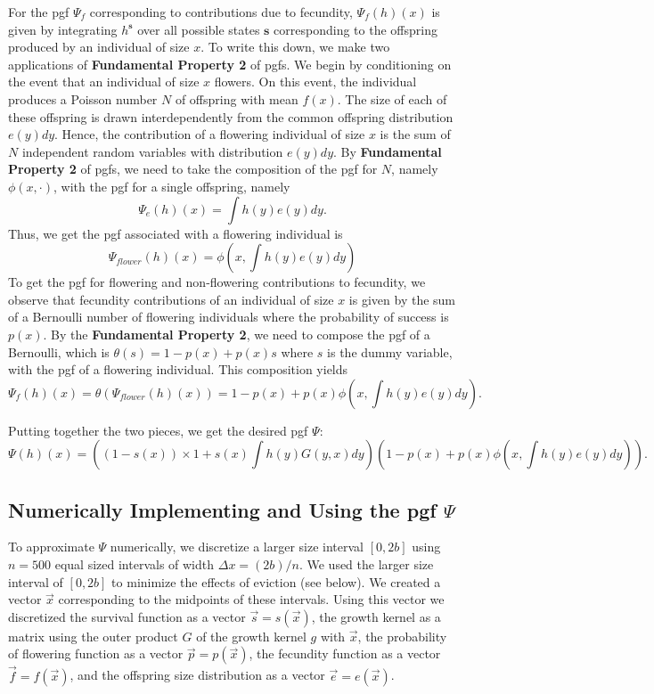 \documentclass[12pt]{amsart}\usepackage[]{graphicx}\usepackage[]{color}
\def\s{\mathbf s}
\begin{document}
For the pgf $\Psi_f$ corresponding to contributions due to fecundity, $\Psi_f(h)(x)$ is given by integrating $h^\s$ over all possible states $\s$ corresponding to the offspring produced by an individual of size $x$.  To write this down, we make two applications of  \textbf{Fundamental Property 2} of pgfs. We begin by conditioning on the event that an individual of size $x$ flowers. On this event, the individual produces a Poisson number $N$ of offspring with mean $f(x)$. The size of each of these offspring is drawn interdependently from the common offspring distribution $e(y)dy$. Hence, the contribution of a flowering individual of size $x$ is the sum of $N$ independent random variables with distribution $e(y)dy$. By \textbf{Fundamental Property 2} of pgfs, we need to take the composition of the pgf for $N$, namely $\phi(x,\cdot)$, with the pgf for a single offspring, namely
\[
\Psi_e(h)(x)=\int h(y)e(y)dy.
\]
Thus, we get the pgf associated with a flowering individual is
\[
\Psi_{flower}(h)(x)=\phi(x,\int h(y)e(y)dy)
\]
To get the pgf for flowering and non-flowering contributions to fecundity, we observe that fecundity contributions of an individual of size $x$ is given by the sum of a Bernoulli number of flowering individuals where the probability of success is $p(x)$. By the \textbf{Fundamental Property 2}, we need to compose the pgf of a Bernoulli, which is $\theta(s)=1-p(x)+p(x)s$ where $s$ is the dummy variable, with the pgf of a flowering individual. This composition yields
\[
\Psi_f (h)(x)=\theta(\Psi_{flower}(h)(x))=1-p(x)+p(x)\phi(x,\int h(y)e(y)dy).
\]


Putting together the two pieces, we get the desired pgf $\Psi$:
\[
\Psi(h)(x)=\left((1-s(x))\times 1 + s(x)\int h(y)G(y,x)dy\right)\left(1-p(x)+p(x)\phi(x,\int h(y)e(y)dy)\right).
\]


\subsection*{Numerically Implementing and Using the pgf $\Psi$}

To approximate $\Psi$ numerically, we discretize a larger size interval $[0,2b]$ using $n=500$ equal sized intervals of width $\Delta x=(2b)/n$. We used the larger size interval of $[0,2b]$ to minimize the effects of eviction (see below). We created a vector $\vec x$ corresponding to the midpoints of these intervals. Using this vector we discretized the survival function as a vector $\vec s=s(\vec x)$, the growth kernel as a matrix using the outer product $G$ of the growth kernel $g$ with $\vec x$, the probability of flowering function as a vector $\vec p=p(\vec x)$, the fecundity function as a vector $\vec f=f(\vec x)$, and the offspring size distribution as a vector $\vec e=e(\vec x)$.
\end{document}
